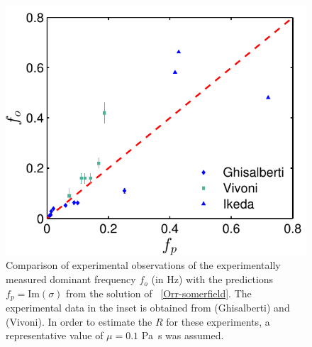\documentclass[12pt]{report}   %
\newcommand{\Rey}{{R}}
\begin{document}
\begin{figure}
\centerline{\includegraphics[]{new_graph_freq}}
\caption{Comparison of experimental observations of the experimentally measured dominant frequency $f_o$ (in Hz) with the predictions $f_p=\text{Im}(\sigma)$ from the solution of ~\eqref{Orr-somerfield}. 
The experimental data in the inset is obtained from \cite{Ghisal02} (Ghisalberti) and \cite{Vivoni98} (Vivoni). 
In order to estimate the $\Rey$ for these experiments, a representative value of $\mu=0.1$ Pa~s was assumed.
}
\label{frequency_comparison}
\end{figure}
\end{document}
